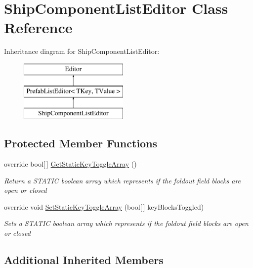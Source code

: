 \hypertarget{class_ship_component_list_editor}{\section{Ship\-Component\-List\-Editor Class Reference}
\label{class_ship_component_list_editor}
}
Inheritance diagram for Ship\-Component\-List\-Editor\-:\begin{figure}[H]
\begin{center}
\leavevmode
\includegraphics[height=3.000000cm]{class_ship_component_list_editor}
\end{center}
\end{figure}
\subsection*{Protected Member Functions}
\begin{DoxyCompactItemize}
\item 
override bool\mbox{[}$\,$\mbox{]} \hyperlink{class_ship_component_list_editor_a6b4a3f15ef6527d4b98b91dcab69d34e}{Get\-Static\-Key\-Toggle\-Array} ()
\begin{DoxyCompactList}\small\item\em Return a S\-T\-A\-T\-I\-C boolean array which represents if the foldout field blocks are open or closed \end{DoxyCompactList}\item 
override void \hyperlink{class_ship_component_list_editor_a32bf47a4ec5ee1b5769a986bcaf6cf06}{Set\-Static\-Key\-Toggle\-Array} (bool\mbox{[}$\,$\mbox{]} key\-Blocks\-Toggled)
\begin{DoxyCompactList}\small\item\em Sets a S\-T\-A\-T\-I\-C boolean array which represents if the foldout field blocks are open or closed \end{DoxyCompactList}\end{DoxyCompactItemize}
\subsection*{Additional Inherited Members}


